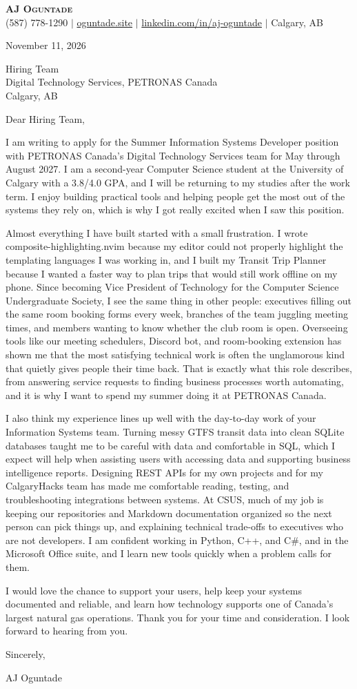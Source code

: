 \documentclass[letterpaper,11pt]{article}
\begin{document}
\begin{center}
    \textbf{\Huge \scshape AJ Oguntade} \\ \vspace{4pt}
    \small (587) 778-1290 $|$
    {\underline{oguntade.site}} $|$
    {\underline{linkedin.com/in/aj-oguntade}} $|$
    Calgary, AB
\end{center}
\vspace{6pt}

November 11, 2026

Hiring Team \\
Digital Technology Services, PETRONAS Canada \\
Calgary, AB

Dear Hiring Team,

I am writing to apply for the Summer Information Systems Developer position with PETRONAS Canada's Digital Technology Services team for May through August 2027. I am a second-year Computer Science student at the University of Calgary with a 3.8/4.0 GPA, and I will be returning to my studies after the work term. I enjoy building practical tools and helping people get the most out of the systems they rely on, which is why I got really excited when I saw this position.

Almost everything I have built started with a small frustration. I wrote composite-highlighting.nvim because my editor could not properly highlight the templating languages I was working in, and I built my Transit Trip Planner because I wanted a faster way to plan trips that would still work offline on my phone. Since becoming Vice President of Technology for the Computer Science Undergraduate Society, I see the same thing in other people: executives filling out the same room booking forms every week, branches of the team juggling meeting times, and members wanting to know whether the club room is open. Overseeing tools like our meeting schedulers, Discord bot, and room-booking extension has shown me that the most satisfying technical work is often the unglamorous kind that quietly gives people their time back. That is exactly what this role describes, from answering service requests to finding business processes worth automating, and it is why I want to spend my summer doing it at PETRONAS Canada.

I also think my experience lines up well with the day-to-day work of your Information Systems team. Turning messy GTFS transit data into clean SQLite databases taught me to be careful with data and comfortable in SQL, which I expect will help when assisting users with accessing data and supporting business intelligence reports. Designing REST APIs for my own projects and for my CalgaryHacks team has made me comfortable reading, testing, and troubleshooting integrations between systems. At CSUS, much of my job is keeping our repositories and Markdown documentation organized so the next person can pick things up, and explaining technical trade-offs to executives who are not developers. I am confident working in Python, C++, and C\#, and in the Microsoft Office suite, and I learn new tools quickly when a problem calls for them.

I would love the chance to support your users, help keep your systems documented and reliable, and learn how technology supports one of Canada's largest natural gas operations. Thank you for your time and consideration. I look forward to hearing from you.

Sincerely,

AJ Oguntade
\end{document}
